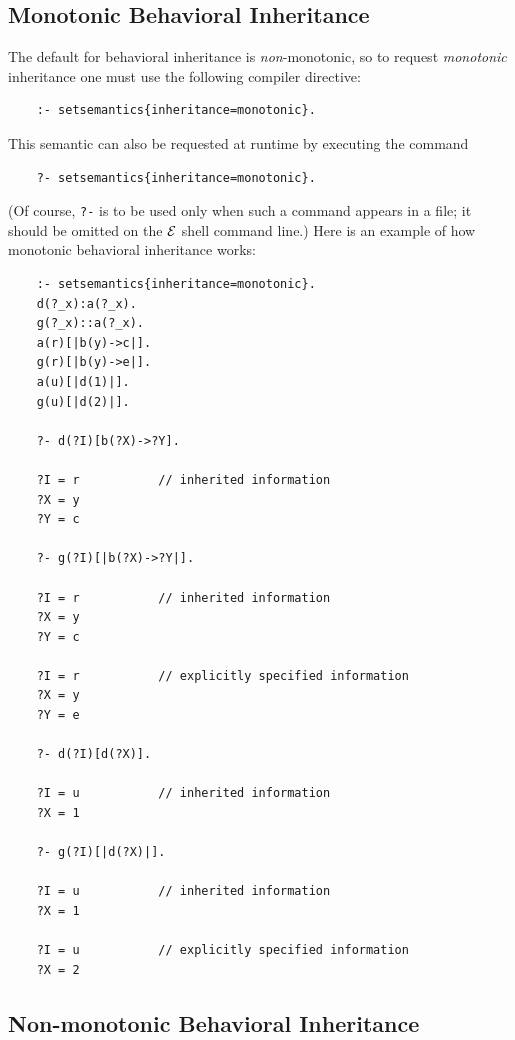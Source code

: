 \documentclass[11pt]{article}
\newcommand{\ERGO}{\mbox{\ensuremath{\cal{E}}\smaller{{\sc{RGO}}}}\xspace}
\newcommand{\FLSYSTEM}{\ERGO}
\begin{document}
\subsection{Monotonic Behavioral Inheritance}

The default for behavioral inheritance is \emph{non}-monotonic, so to request
\emph{monotonic} inheritance one must use the following compiler directive:
\begin{verbatim}
    :- setsemantics{inheritance=monotonic}.
\end{verbatim}
This semantic can also be requested at runtime by executing the command
\begin{verbatim}
    ?- setsemantics{inheritance=monotonic}.
\end{verbatim}
(Of course, \texttt{?-} is to be used only when such a command appears in a
file; it should be omitted on the \FLSYSTEM shell command line.) 
Here is an example of how monotonic behavioral inheritance works:
\begin{verbatim}
    :- setsemantics{inheritance=monotonic}.
    d(?_x):a(?_x).
    g(?_x)::a(?_x).
    a(r)[|b(y)->c|].
    g(r)[|b(y)->e|].
    a(u)[|d(1)|].
    g(u)[|d(2)|].

    ?- d(?I)[b(?X)->?Y].

    ?I = r           // inherited information
    ?X = y
    ?Y = c

    ?- g(?I)[|b(?X)->?Y|].

    ?I = r           // inherited information
    ?X = y
    ?Y = c

    ?I = r           // explicitly specified information
    ?X = y
    ?Y = e

    ?- d(?I)[d(?X)].

    ?I = u           // inherited information
    ?X = 1

    ?- g(?I)[|d(?X)|].

    ?I = u           // inherited information
    ?X = 1

    ?I = u           // explicitly specified information
    ?X = 2
\end{verbatim}

\subsection{Non-monotonic Behavioral Inheritance}
\end{document}
